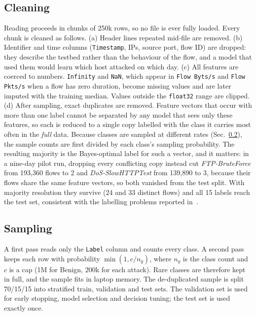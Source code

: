 \documentclass[conference]{IEEEtran}
\begin{document}
\begin{table}[t]
\caption{Class distribution: all flows vs.\ the cleaned, capped sample}
\label{tab:data}
\centering\footnotesize

\end{table}

\subsection{Cleaning}\label{sec:cleaning}
Reading proceeds in chunks of 250k rows, so no file is ever fully loaded.
Every chunk is cleaned as follows. (a) Header lines repeated mid-file are
removed. (b) Identifier and time columns (\texttt{Timestamp}, IPs, source
port, flow ID) are dropped: they describe the testbed rather than the
behaviour of the flow, and a model that used them would learn which host
attacked on which day. (c) All features are coerced to numbers.
\texttt{Infinity} and \texttt{NaN}, which appear in \texttt{Flow Byts/s} and
\texttt{Flow Pkts/s} when a flow has zero duration, become missing values and
are later imputed with the training median. Values outside the
\texttt{float32} range are clipped. (d) After sampling, exact duplicates are
removed. Feature vectors that occur with more than one label cannot be
separated by any model that sees only these features, so each is reduced to a
single copy labelled with the class it carries most often in the \emph{full}
data. Because classes are sampled at different rates (Sec.~\ref{sec:sampling}),
the sample counts are first divided by each class's sampling probability.
The resulting majority is the Bayes-optimal label for such a vector, and it
matters: in a nine-day pilot run, dropping every conflicting copy instead cut
\emph{FTP-BruteForce} from 193{,}360 flows to 2 and \emph{DoS-SlowHTTPTest}
from 139{,}890 to 3, because their flows share the same feature vectors, so
both vanished from the test split. With majority resolution they survive (24
and 33 distinct flows) and all 15 labels reach the test set, consistent with
the labelling problems reported in~\cite{liu2022}.

\subsection{Sampling}\label{sec:sampling}
A first pass reads only the \texttt{Label} column and counts every class. A
second pass keeps each row with probability $\min(1, c/n_y)$, where $n_y$ is
the class count and $c$ is a cap (1M for Benign, 200k for each attack). Rare
classes are therefore kept in full, and the sample fits in laptop memory. The
de-duplicated sample is split 70/15/15 into stratified train, validation and
test sets. The validation set is used for early stopping, model selection and
decision tuning; the test set is used exactly once.
\end{document}
